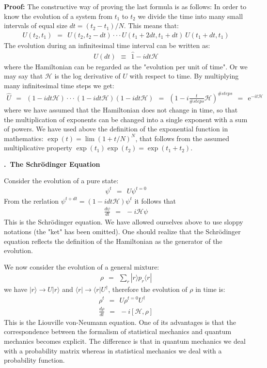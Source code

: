 \documentclass[onecolumn,fleqn, 11pt]{revtex4}
\newcommand{\eexp}{\mathrm{e}^}
\newcommand{\beq}{\begin{eqnarray}}
\newcommand{\eeq}{\end{eqnarray}}
\renewcommand{\thesubsection}{\arabic{subsection}}
\renewcommand{\thesubsubsection}{\arabic{subsubsection}}
\newcommand{\sheadC}[1]
{
\addtocounter{subsubsection}{1}
\vspace{5mm}
{\bf \thesubsection.\thesubsubsection \ #1}  
\nopagebreak
\phantomsection
}
\begin{document}
 
{\bf Proof:} 
The constructive way of proving the last formula is as follows:
In order to know the evolution of a system from ${t_1}$ to ${t_2}$ 
we divide the time into many small intervals 
of equal size ${dt = (t_2-t_1)/N}$. This means that:
\beq
U(t_2,t_1) \ \ = \ \ U(t_2,t_2{-}dt) \cdot\cdot\cdot  U(t_1{+}2dt,t_1+dt) \ U(t_1{+}dt,t_1)
\eeq
The evolution during an infinitesimal time interval can be written as:
\beq
U(dt) \ \ \equiv \ \ \hat{1} - i dt \mathcal{H} 
\eeq
where the Hamiltonian can be regarded as the "evolution per unit of time". 
Or we may say that $\mathcal{H}$ is the log derivative of $U$ with respect 
to time. By multiplying many infinitesimal time steps we get:
\beq
\hat{U} \ \ =  \ \ (1-i dt\mathcal{H})\cdot \cdot \cdot (1-i dt\mathcal{H}) (1-idt\mathcal{H})
\ \ = \ \ 
\left(1-i \frac{t}{\#steps}\mathcal{H}\right)^{\#steps} 
\ \ = \ \ \eexp{-it\mathcal{H}} 
\eeq
where we have assumed that the Hamiltonian does not 
change in time, so that the multiplication of exponents 
can be changed into a single exponent with a sum of powers. 
We have used above the definition of the 
exponential function in mathematics: ${\exp(t) = \lim (1+t/N)^N}$, 
that follows from the assumed 
multiplicative property ${\exp(t_1)\exp(t_2)=\exp(t_1+t_2)}$. 


 
\sheadC{The Schr\"{o}dinger Equation}


Consider the evolution of a pure state:
\beq
\psi^{t} \ \ = \ \ U \psi^{t{=}0} 
\eeq
From the rerlation ${\psi^{t+dt} =(1-idt\mathcal{H})\psi^{t}}$ it follows that  
\beq 
\frac{d\psi}{dt} \ \ = \ \ -i\mathcal{H}\psi
\eeq
This is the Schr\"{o}dinger equation.
We have allowed ourselves above to use 
sloppy notations (the "ket" has been omitted). 
One should realize that the Schr\"{o}dinger equation
reflects the definition of the Hamiltonian 
as the generator of the evolution.
 
We now consider the evolution of a general mixture:
\beq
\rho \ \ = \ \ \sum_r |r\rangle p_r \langle r|
\eeq
we have $|r\rangle \rightarrow U|r\rangle$ and $\langle r| \rightarrow \langle r|U^\dagger$, 
therefore the evolution of $\rho$ in time is:
\beq
\rho^t \ \ = \ \ U \rho^{t{=}0}U^{\dagger} 
\\ 
\frac{d\rho}{dt} \ \ = \ \ -i[\mathcal{H}, \rho]
\eeq
This is the Liouville von-Neumann equation. 
One of its advantages is that the correspondence 
between the formalism of statistical mechanics  
and quantum mechanics becomes explicit. 
The difference is that in quantum mechanics we deal 
with a probability matrix whereas in statistical mechanics 
we deal with a probability function. 
\end{document}
